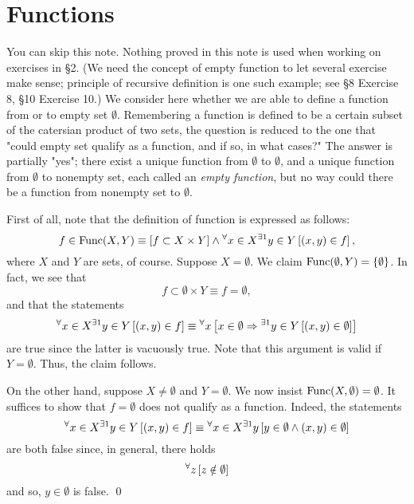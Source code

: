 \documentclass[a4paper,12pt]{article}
\begin{document}
\section{Functions}
\setcounter{exe}{0}

\begin{rem}
	You can skip this note.
	Nothing proved in this note is used when working on exercises in \S2.
	(We need the concept of empty function to let several exercise make sense; principle of recursive definition is one such example; see \S8 Exercise 8, \S10 Exercise 10.)
	We consider here whether we are able to define a function from or to empty set \( \emptyset \).
	Remembering a function is defined to be a certain subset of the catersian product of two sets,
	the question is reduced to the one that "could empty set qualify as a function, and if so, in what cases?"
	The answer is partially "yes";
	there exist a unique function from \( \emptyset \) to \( \emptyset \),
	and a unique function from \( \emptyset \) to nonempty set,
	each called an \textit{empty function},
	but no way could there be a function from nonempty set to \( \emptyset \).
	
	First of all, note that the definition of function is expressed as follows:
	\begin{equation*}
		f\in \mathrm{Func}(X,Y)
		\equiv
		\left[ f \subset X \times Y \right]
		\wedge
		{}^{\forall}  x\in X
		{}^{\exists 1} y\in Y
		\left[ (x,y)\in f \right],
	\end{equation*}
	where \( X \)
	and
	\( Y \)
	are sets, of course.
	Suppose \( X=\emptyset \).
	We claim \( \mathrm{Func}(\emptyset,Y)=\{\emptyset\} \).
	In fact, we see that
	\begin{equation*}
		f \subset \emptyset \times Y
		\equiv
		f = \emptyset,
	\end{equation*}
	and that the statements
	\begin{equation*}
		{}^{\forall}  x\in X
		{}^{\exists 1} y\in Y
		\left[ (x,y)\in f \right]
		\equiv
		{}^{\forall}  x
		\left[ x \in \emptyset
			\Rightarrow
			{}^{\exists 1} y\in Y \left[ (x,y)\in \emptyset \right]
			\right]
	\end{equation*}
	are true since the latter is vacuously true.
	Note that this argument is valid if \( Y=\emptyset \).
	Thus, the claim follows.
	
	On the other hand, suppose \( X \neq \emptyset \) and \( Y = \emptyset \).
	We now insist \( \mathrm{Func}(X,\emptyset)= \emptyset \).
	It suffices to show that \( f = \emptyset \) does not qualify as a function.
	Indeed, the statements
	\begin{equation*}
		{}^{\forall}  x\in X
		{}^{\exists 1} y\in Y
		\left[ (x,y)\in f \right]
		\equiv
		{}^{\forall}  x\in X
		{}^{\exists 1} y
		\left[ y\in \emptyset \wedge (x,y)\in \emptyset \right]
	\end{equation*}
	are both false since, in general, there holds
	\begin{equation*}
		{}^{\forall}  z\left[ z \notin \emptyset \right]
	\end{equation*}
	and so, \( y\in \emptyset \) is false.
	\qed\end{rem}
\end{document}
